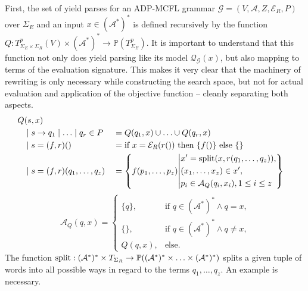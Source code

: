 \documentclass[
    a4paper,
    12pt,
    twoside,
    BCOR=12mm,
    parskip=half,
    chapterprefix,
    numbers=noenddot,
    bibliography=totoc
]{scrbook}
\begin{document}
First, the set of yield parses for an ADP-MCFL grammar $\mathcal{G}=(V,\mathcal{A},Z,\mathcal{E}_R,P)$ over $\Sigma_E$ and an input $x \in (\mathcal{A}^*)^*$ is defined recursively by the function $Q: T^p_{\Sigma_E \times \Sigma_R}(V) \times (\mathcal{A}^*)^* \to \mathbb{P}(T^p_{\Sigma_E})$. It is important to understand that this function not only does yield parsing like its model $\mathcal{Q}_\mathcal{G}(x)$, but also mapping to terms of the evaluation signature. This makes it very clear that the machinery of rewriting is only necessary while constructing the search space, but not for actual evaluation and application of the objective function -- cleanly separating both aspects.
\begin{align}
	Q&(s,x) \nonumber\\
	&\mid s \to q_1 \mid \ldots \mid q_r \in P &&= Q(q_1,x) \cup \ldots \cup Q(q_r,x)\\
	&\mid s=(f,r)() &&= \text{if $x=\mathcal{E}_R(r())$ then $\{f()\}$ else $\{\}$} \\
	&\mid s=(f,r)(q_1,\ldots,q_z) &&= \left\{f(p_1,\ldots,p_z) \middle\vert
			\begin{aligned}
			  &x' = \op{split}(x,r(q_1,\ldots,q_z)),\\
				&(x_1,\ldots,x_z) \in x',\\
				&p_i \in \mathcal{A}_Q(q_i,x_i),1 \leq i \leq z
			\end{aligned}
			\right\}
\end{align}
\begin{equation}
	\mathcal{A}_Q(q,x)= \begin{cases}
		\{q\}, & \text{if $q \in (\mathcal{A}^*)^* \wedge q=x$,}\\
		\{\},  & \text{if $q \in (\mathcal{A}^*)^* \wedge q \neq x$,}\\
		Q(q,x),&\text{else.}
	\end{cases}
\end{equation}
The function $\mathrm{split}: (\mathcal{A}^*)^* \times T_{\Sigma_R} \to \mathbb{P}( (\mathcal{A}^*)^* \times \ldots \times (\mathcal{A}^*)^*)$ splits a given tuple of words into all possible ways in regard to the terms $q_1,\ldots,q_z$. An example is necessary.

\pagebreak
\end{document}
